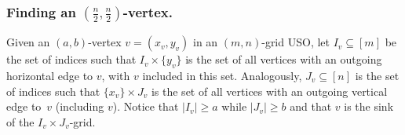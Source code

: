 \documentclass[runningheads,a4paper]{llncs}
\begin{document}
% 
% 

\subsubsection{Finding an $(\frac{n}{2}, \frac{n}{2})$-vertex.}

Given an $(a, b)$-vertex $v = (x_v, y_v)$ in an $(m,n)$-grid USO, let $I_v\subseteq [m]$ be the set of indices such that  $I_v \times \{y_v\}$ is the set of all vertices with an outgoing horizontal edge to $v$, with $v$ included in this set. Analogously, $J_v\subseteq [n]$ is the set of indices such that $\{x_v\}\times J_v$ is the set of all vertices with an outgoing vertical edge to~$v$ (including $v$). Notice that $|I_v| \geq a$ while $|J_v| \geq b$ and that $v$ is the sink of the $I_v\times J_v$-grid.
\end{document}
